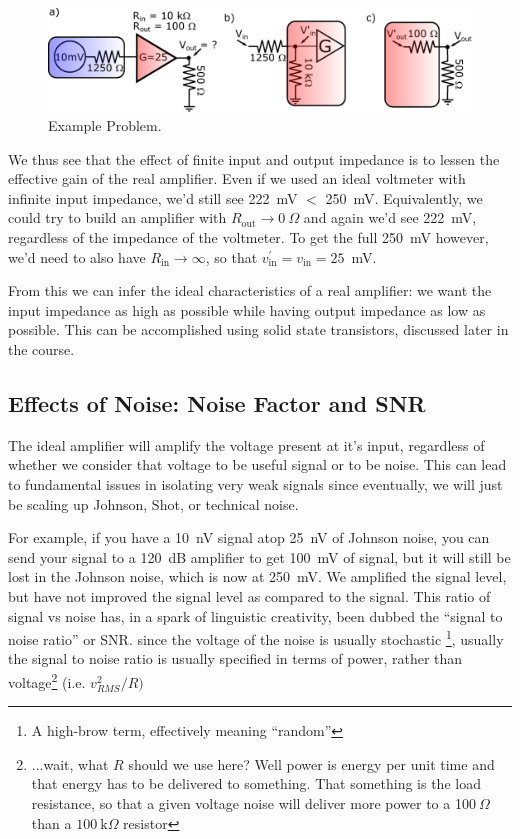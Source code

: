 \documentclass{tufte-book}
\begin{document}
\begin{figure}[ht]
\caption{Example Problem.}
\label{fig:prob_amp}
\begin{center}
\includegraphics[width=\textwidth]{Images/amp_example.pdf}
\end{center}
\end{figure}

We thus see that the effect of finite input and output impedance is to lessen the effective gain of the real amplifier. Even if we used an ideal voltmeter with infinite input impedance, we'd still see 222~mV $<$ 250~mV. Equivalently, we could try to build an amplifier with $R_\text{out} \rightarrow 0~\Omega$ and again we'd see 222~mV, regardless of the impedance of the voltmeter. To get the full 250~mV however, we'd need to also have $R_\text{in} \rightarrow \infty$, so that $v_\text{in}^\prime = v_\text{in} = 25$~mV. 

From this we can infer the ideal characteristics of a real amplifier: we want the input impedance as high as possible while having output impedance as low as possible. This can be accomplished using solid state transistors, discussed later in the course. 

\subsection{Effects of Noise: Noise Factor and SNR}
The ideal amplifier will amplify the voltage present at it's input, regardless of whether we consider that voltage to be useful signal or to be noise. This can lead to fundamental issues in isolating very weak signals since eventually, we will just be scaling up Johnson, Shot, or technical noise. 

For example, if you have a 10~nV signal atop 25~nV of Johnson noise, you can send your signal to a 120~dB amplifier to get 100~mV of signal, but it will still be lost in the Johnson noise, which is now at 250~mV.  We amplified the signal level, but have not improved the signal level as compared to the signal. This ratio of signal vs noise has, in a spark of linguistic creativity, been dubbed the ``signal to noise ratio'' or SNR. since the voltage of the noise is usually stochastic \footnote{ A high-brow term, effectively meaning ``random''}, usually the signal to noise ratio is usually specified in terms of power, rather than voltage\footnote{ ...wait, what $R$ should we use here? Well power is energy per unit time and that energy has to be delivered to something. That something is the load resistance, so that a given voltage noise will deliver more power to a 1$00~\Omega$ than a $100~\text{k}\Omega$ resistor} (i.e. $v_{RMS}^2/R)$
\end{document}
